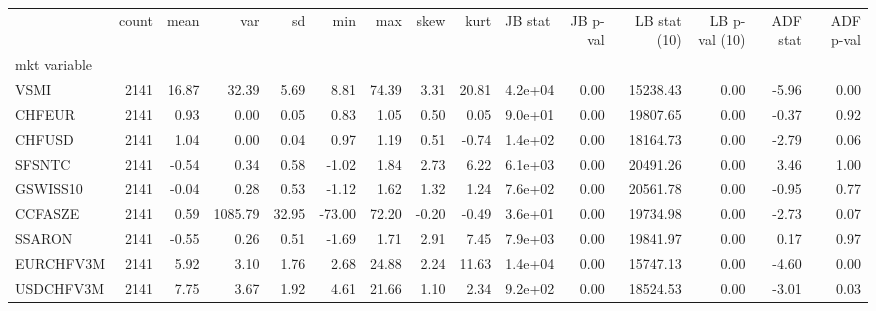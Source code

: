 \begin{tabular}{lrrrrrrrrlrrrrr}
\toprule
 & count & mean & var & sd & min & max & skew & kurt & JB stat & JB p-val & LB stat (10) & LB p-val (10) & ADF stat & ADF p-val \\
mkt variable &  &  &  &  &  &  &  &  &  &  &  &  &  &  \\
\midrule
VSMI & 2141 & 16.87 & 32.39 & 5.69 & 8.81 & 74.39 & 3.31 & 20.81 & 4.2e+04 & 0.00 & 15238.43 & 0.00 & -5.96 & 0.00 \\
CHFEUR & 2141 & 0.93 & 0.00 & 0.05 & 0.83 & 1.05 & 0.50 & 0.05 & 9.0e+01 & 0.00 & 19807.65 & 0.00 & -0.37 & 0.92 \\
CHFUSD & 2141 & 1.04 & 0.00 & 0.04 & 0.97 & 1.19 & 0.51 & -0.74 & 1.4e+02 & 0.00 & 18164.73 & 0.00 & -2.79 & 0.06 \\
SFSNTC & 2141 & -0.54 & 0.34 & 0.58 & -1.02 & 1.84 & 2.73 & 6.22 & 6.1e+03 & 0.00 & 20491.26 & 0.00 & 3.46 & 1.00 \\
GSWISS10 & 2141 & -0.04 & 0.28 & 0.53 & -1.12 & 1.62 & 1.32 & 1.24 & 7.6e+02 & 0.00 & 20561.78 & 0.00 & -0.95 & 0.77 \\
CCFASZE & 2141 & 0.59 & 1085.79 & 32.95 & -73.00 & 72.20 & -0.20 & -0.49 & 3.6e+01 & 0.00 & 19734.98 & 0.00 & -2.73 & 0.07 \\
SSARON & 2141 & -0.55 & 0.26 & 0.51 & -1.69 & 1.71 & 2.91 & 7.45 & 7.9e+03 & 0.00 & 19841.97 & 0.00 & 0.17 & 0.97 \\
EURCHFV3M & 2141 & 5.92 & 3.10 & 1.76 & 2.68 & 24.88 & 2.24 & 11.63 & 1.4e+04 & 0.00 & 15747.13 & 0.00 & -4.60 & 0.00 \\
USDCHFV3M & 2141 & 7.75 & 3.67 & 1.92 & 4.61 & 21.66 & 1.10 & 2.34 & 9.2e+02 & 0.00 & 18524.53 & 0.00 & -3.01 & 0.03 \\
\bottomrule
\end{tabular}
